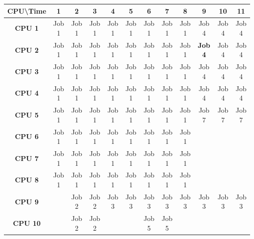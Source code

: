 \documentclass[11pt]{article}
\begin{document}
\begin{table}[]
\centering
\begin{tabular}{|c|c|c|c|c|c|c|c|c|c|c|c|}
\hline
\textbf{CPU\textbackslash{}Time} & \textbf{1} & \textbf{2} & \textbf{3} & \textbf{4} & \textbf{5} & \textbf{6} & \textbf{7} & \textbf{8} & \textbf{9}     & \textbf{10} & \textbf{11} \\ \hline
\textbf{CPU 1}                   & Job 1      & Job 1      & Job 1      & Job 1      & Job 1      & Job 1      & Job 1      & Job 1      & Job 4          & Job 4       & Job 4       \\ \hline
\textbf{CPU 2}                   & Job 1      & Job 1      & Job 1      & Job 1      & Job 1      & Job 1      & Job 1      & Job 1      & \textbf{Job 4} & Job 4       & Job 4       \\ \hline
\textbf{CPU 3}                   & Job 1      & Job 1      & Job 1      & Job 1      & Job 1      & Job 1      & Job 1      & Job 1      & Job 4          & Job 4       & Job 4       \\ \hline
\textbf{CPU 4}                   & Job 1      & Job 1      & Job 1      & Job 1      & Job 1      & Job 1      & Job 1      & Job 1      & Job 4          & Job 4       & Job 4       \\ \hline
\textbf{CPU 5}                   & Job 1      & Job 1      & Job 1      & Job 1      & Job 1      & Job 1      & Job 1      & Job 1      & Job 7          & Job 7       & Job 7       \\ \hline
\textbf{CPU 6}                   & Job 1      & Job 1      & Job 1      & Job 1      & Job 1      & Job 1      & Job 1      & Job 1      &                &             &             \\ \hline
\textbf{CPU 7}                   & Job 1      & Job 1      & Job 1      & Job 1      & Job 1      & Job 1      & Job 1      & Job 1      &                &             &             \\ \hline
\textbf{CPU 8}                   & Job 1      & Job 1      & Job 1      & Job 1      & Job 1      & Job 1      & Job 1      & Job 1      &                &             &             \\ \hline
\textbf{CPU 9}                   &            & Job 2      & Job 2      & Job 3      & Job 3      & Job 3      & Job 3      & Job 3      & Job 3          & Job 3       & Job 3       \\ \hline
\textbf{CPU 10}                  &            & Job 2      & Job 2      &            &            & Job 5      & Job 5      &            &                &             &             \\ \hline

\end{tabular}
\end{table}
\end{document}
